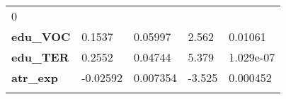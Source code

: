 \documentclass[]{article}
\begin{document}
\begin{longtable}[]{@{}lllll@{}}
\begin{minipage}[t]{0.14\columnwidth}
0\strut
\end{minipage}\tabularnewline
\begin{minipage}[t]{0.23\columnwidth}\raggedright
\textbf{edu\_VOC}\strut
\end{minipage} & \begin{minipage}[t]{0.14\columnwidth}\raggedright
0.1537\strut
\end{minipage} & \begin{minipage}[t]{0.16\columnwidth}\raggedright
0.05997\strut
\end{minipage} & \begin{minipage}[t]{0.12\columnwidth}\raggedright
2.562\strut
\end{minipage} & \begin{minipage}[t]{0.14\columnwidth}\raggedright
0.01061\strut
\end{minipage}\tabularnewline
\begin{minipage}[t]{0.23\columnwidth}\raggedright
\textbf{edu\_TER}\strut
\end{minipage} & \begin{minipage}[t]{0.14\columnwidth}\raggedright
0.2552\strut
\end{minipage} & \begin{minipage}[t]{0.16\columnwidth}\raggedright
0.04744\strut
\end{minipage} & \begin{minipage}[t]{0.12\columnwidth}\raggedright
5.379\strut
\end{minipage} & \begin{minipage}[t]{0.14\columnwidth}\raggedright
1.029e-07\strut
\end{minipage}\tabularnewline
\begin{minipage}[t]{0.23\columnwidth}\raggedright
\textbf{atr\_exp}\strut
\end{minipage} & \begin{minipage}[t]{0.14\columnwidth}\raggedright
-0.02592\strut
\end{minipage} & \begin{minipage}[t]{0.16\columnwidth}\raggedright
0.007354\strut
\end{minipage} & \begin{minipage}[t]{0.12\columnwidth}\raggedright
-3.525\strut
\end{minipage} & \begin{minipage}[t]{0.14\columnwidth}\raggedright
0.000452\strut
\end{minipage}\tabularnewline
\begin{minipage}[t]{0.23\columnwidth}\raggedright

\end{minipage}
\end{longtable}
\end{document}
